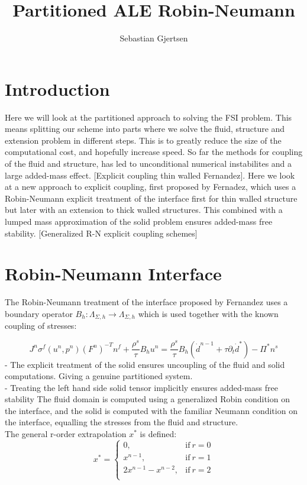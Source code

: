 
\usepackage{listings}
\usepackage{amsmath}
\title{Partitioned ALE Robin-Neumann}
\author{Sebastian Gjertsen}

\maketitle


\section*{Introduction}
Here we will look at the partitioned approach to solving the FSI problem. This means splitting our scheme into parts where we solve the fluid, structure and extension problem in different steps. This is to greatly reduce the size of the computational cost, and hopefully increase speed. So far the methods for coupling of the fluid and structure, has led to unconditional numerical instabilites and a large added-mass effect. [Explicit coupling thin walled Fernandez]. Here we look at a new approach to explicit coupling, first proposed by Fernadez, which uses a Robin-Neumann explicit treatment of the interface first for thin walled structure but later with an extension to thick walled structures. This combined with a lumped mass approximation of the solid problem ensures added-mass free stability. [Generalized R-N explicit coupling schemes]

\section*{Robin-Neumann Interface}
The Robin-Neumann treatment of the interface proposed by Fernandez uses a boundary operator $ B_h : \Lambda_{\Sigma, h} \rightarrow \Lambda_{\Sigma, h}  $ which is used together with the known coupling of stresses:

$$  J^n \sigma^f(u^n, p^n)(F^n)^{-T}n^f + \frac{\rho^s}{\tau} B_h u^n = \frac{\rho^s}{\tau} B_h (\dot{d}^{n-1} + \tau \partial_t \dot{d}^*  ) - \Pi^{*} n^s $$
- The explicit treatment of the solid ensures uncoupling of the fluid and solid computations. Giving a genuine partitioned system. \\
- Treating the left hand side solid tensor implicitly ensures added-mass free stability
The fluid domain is computed using a generalized Robin condition on the interface, and the solid is computed with the familiar Neumann condition on the interface, equalling the stresses from the fluid and structure.\\
The general r-order extrapolation $x^*$ is defined: 
\begin{equation}
    x^*=
    \begin{cases}
      0, & \text{if}\ r=0 \\
      x^{n-1}, & \text{if}\ r =1 \\
      2x^{n-1} - x^{n-2}, & \text{if}\ r =2 \\
    \end{cases}
\end{equation}


